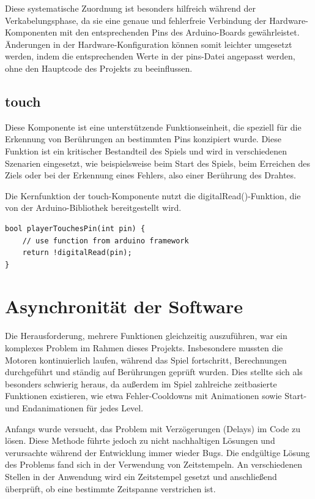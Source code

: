 Diese systematische Zuordnung ist besonders hilfreich während der Verkabelungsphase, da sie eine genaue und fehlerfreie Verbindung der Hardware-Komponenten mit den entsprechenden Pins des Arduino-Boards gewährleistet. Änderungen in der Hardware-Konfiguration können somit leichter umgesetzt werden, indem die entsprechenden Werte in der pins-Datei angepasst werden, ohne den Hauptcode des Projekts zu beeinflussen.

\subsection{touch}
Diese Komponente ist eine unterstützende Funktionseinheit, die speziell für die Erkennung von Berührungen an bestimmten Pins konzipiert wurde. Diese Funktion ist ein kritischer Bestandteil des Spiels und wird in verschiedenen Szenarien eingesetzt, wie beispielsweise beim Start des Spiels, beim Erreichen des Ziels oder bei der Erkennung eines Fehlers, also einer Berührung des Drahtes.

Die Kernfunktion der touch-Komponente nutzt die digitalRead()-Funktion, die von der Arduino-Bibliothek bereitgestellt wird.

\begin{minipage}{\linewidth}
\begin{lstlisting}[caption={Detektion von Benutzerberührung},captionpos=b]
bool playerTouchesPin(int pin) {
    // use function from arduino framework
    return !digitalRead(pin);
}
\end{lstlisting}
\end{minipage}

\section{Asynchronität der Software}

Die Herausforderung, mehrere Funktionen gleichzeitig auszuführen, war ein komplexes Problem im Rahmen dieses Projekts. Insbesondere mussten die Motoren kontinuierlich laufen, während das Spiel fortschritt, Berechnungen durchgeführt und ständig auf Berührungen geprüft wurden.
Dies stellte sich als besonders schwierig heraus, da außerdem im Spiel zahlreiche zeitbasierte Funktionen existieren, wie etwa Fehler-Cooldowns mit Animationen sowie Start- und Endanimationen für jedes Level.

Anfangs wurde versucht, das Problem mit Verzögerungen (Delays) im Code zu lösen. Diese Methode führte jedoch zu nicht nachhaltigen Lösungen und verursachte während der Entwicklung immer wieder Bugs.
Die endgültige Lösung des Problems fand sich in der Verwendung von Zeitstempeln. An verschiedenen Stellen in der Anwendung wird ein Zeitstempel gesetzt und anschließend überprüft, ob eine bestimmte Zeitspanne verstrichen ist.

